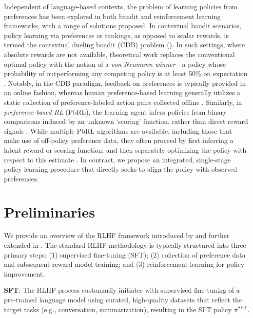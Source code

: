 Independent of language-based contexts, the problem of learning policies from preferences has been explored in both bandit and reinforcement learning frameworks, with a range of solutions proposed. In contextual bandit scenarios, policy learning via preferences or rankings, as opposed to scalar rewards, is termed the contextual dueling bandit (CDB) problem (\cite{yue2012karmed,dudik2015contextual}). In such settings, where absolute rewards are not available, theoretical work replaces the conventional optimal policy with the notion of a \textit{von Neumann winner}—a policy whose probability of outperforming any competing policy is at least 50\% on expectation \citep{dudik2015contextual}. Notably, in the CDB paradigm, feedback on preferences is typically provided in an online fashion, whereas human preference-based learning generally utilizes a static collection of preference-labeled action pairs collected offline \citep{yan2022human}. Similarly, in \textit{preference-based RL} (PbRL), the learning agent infers policies from binary comparisons induced by an unknown `scoring' function, rather than direct reward signals \citep{BusaFekete2014,ruiz2023dueling}. While multiple PbRL algorithms are available, including those that make use of off-policy preference data, they often proceed by first inferring a latent reward or scoring function, and then separately optimizing the policy with respect to this estimate \citep{jain2013learning,BusaFekete2014,christiano2017deep,sadigh2017active,kupcsik2018learning}. In contrast, we propose an integrated, single-stage policy learning procedure that directly seeks to align the policy with observed preferences.

\section{Preliminaries}\label{section:prelims}

We provide an overview of the RLHF framework introduced by \citeauthor{ziegler2020finetuning} and further extended in \citep{stiennon2022learning, bai2022training, ouyang2022training}. The standard RLHF methodology is typically structured into three primary steps: (1) supervised fine-tuning (SFT); (2) collection of preference data and subsequent reward model training; and (3) reinforcement learning for policy improvement.

\textbf{SFT}: The RLHF process customarily initiates with supervised fine-tuning of a pre-trained language model using curated, high-quality datasets that reflect the target tasks (e.g., conversation, summarization), resulting in the SFT policy $\pi^\text{SFT}$.

